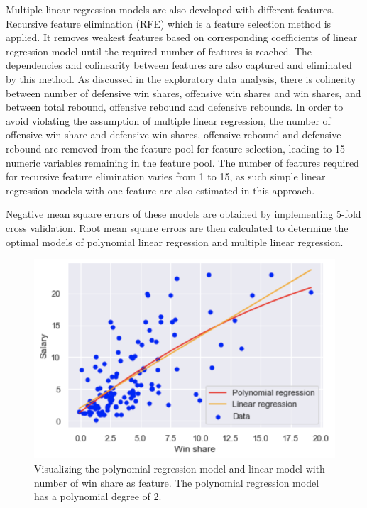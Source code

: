 \documentclass[letterpaper,12pt,twoside,]{pinp}
\begin{document}
Multiple linear regression models are also developed with different
features. Recursive feature elimination (RFE) which is a feature
selection method is applied. It removes weakest features based on
corresponding coefficients of linear regression model until the required
number of features is reached. The dependencies and colinearity between
features are also captured and eliminated by this method. As discussed
in the exploratory data analysis, there is colinerity between number of
defensive win shares, offensive win shares and win shares, and between
total rebound, offensive rebound and defensive rebounds. In order to
avoid violating the assumption of multiple linear regression, the number
of offensive win share and defensive win shares, offensive rebound and
defensive rebound are removed from the feature pool for feature
selection, leading to 15 numeric variables remaining in the feature
pool. The number of features required for recursive feature elimination
varies from 1 to 15, as such simple linear regression models with one
feature are also estimated in this approach.

Negative mean square errors of these models are obtained by implementing
5-fold cross validation. Root mean square errors are then calculated to
determine the optimal models of polynomial linear regression and
multiple linear regression.

\begin{figure}
\includegraphics[width=1\linewidth]{poly_plot.png}
\centering
\caption{Visualizing the polynomial regression model and linear model with number of win share as feature. The polynomial regression model has a polynomial degree of 2.}
\label{fig:poly}
\end{figure}
\end{document}
